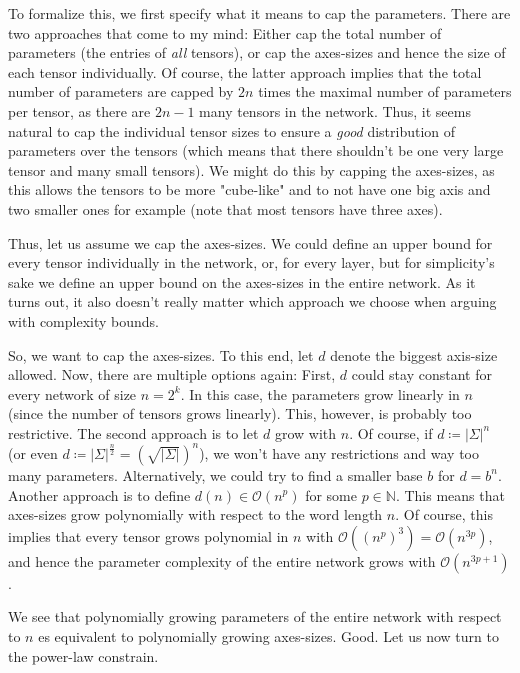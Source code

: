 \documentclass[../../main.tex]{subfiles}
\begin{document}
    To formalize this, we first specify what it means to cap the parameters. There are two approaches that come to my mind: Either cap the total number of parameters (the entries of \emph{all} tensors), or cap the axes-sizes and hence the size of each tensor individually. Of course, the latter approach implies that the total number of parameters are capped by $2n$ times the maximal number of parameters per tensor, as there are $2n-1$ many tensors in the network. Thus, it seems natural to cap the individual tensor sizes to ensure a \emph{good} distribution of parameters over the tensors (which means that there shouldn't be one very large tensor and many small tensors). We might do this by capping the axes-sizes, as this allows the tensors to be more "cube-like" and to not have one big axis and two smaller ones for example (note that most tensors have three axes).

    Thus, let us assume we cap the axes-sizes. We could define an upper bound for every tensor individually in the network, or, for every layer, but for simplicity's sake we define an upper bound on the axes-sizes in the entire network. As it turns out, it also doesn't really matter which approach we choose when arguing with complexity bounds.

    So, we want to cap the axes-sizes. To this end, let $d$ denote the biggest axis-size allowed. Now, there are multiple options again: First, $d$ could stay constant for every network of size $n = 2^k$. In this case, the parameters grow linearly in $n$ (since the number of tensors grows linearly). This, however, is probably too restrictive. The second approach is to let $d$ grow with $n$. Of course, if $d \coloneqq |\Sigma|^n$ (or even $d \coloneqq |\Sigma|^{\frac{n}{2}} = \left(\sqrt{|\Sigma|}\right)^n$), we won't have any restrictions and way too many parameters. Alternatively, we could try to find a smaller base $b$ for $d = b^n$. Another approach is to define $d(n) \in \mathcal{O}(n^p)$ for some $p \in \mathbb{N}$. This means that axes-sizes grow polynomially with respect to the word length $n$. Of course, this implies that every tensor grows polynomial in $n$ with $\mathcal{O}((n^p)^3) = \mathcal{O}(n^{3p})$, and hence the parameter complexity of the entire network grows with $\mathcal{O}(n^{3p+1})$.

    \bigskip
    We see that polynomially growing parameters of the entire network with respect to $n$ es equivalent to polynomially growing axes-sizes. Good. Let us now turn to the power-law constrain.
\end{document}
